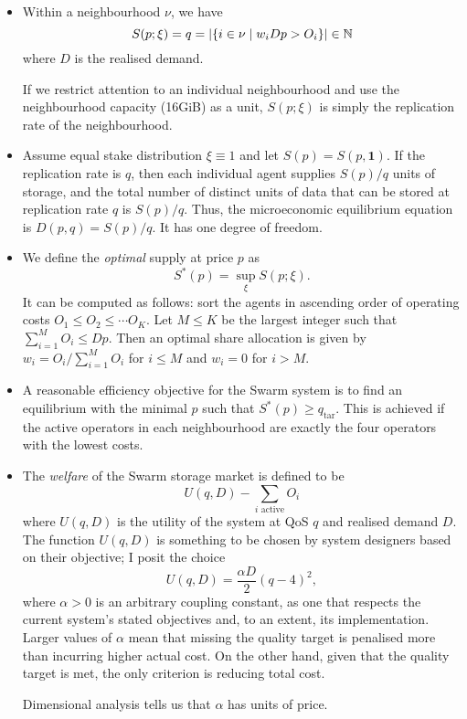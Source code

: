 \begin{itemize}

  \item
    Within a neighbourhood $\nu$, we have 
    \[
      S(p;\xi) = q = |\{i\in\nu \mid w_iDp > O_i  \}| \in \mathbb{N}
    \]
    where $D$ is the realised demand.

    If we restrict attention to an individual neighbourhood and use the neighbourhood capacity (16GiB) as a unit, $S(p;\xi)$ is simply the replication rate of the neighbourhood.

  \item
    Assume equal stake distribution $\xi \equiv 1$ and let $S(p)=S(p,\mathbf{1})$.
    If the replication rate is $q$, then each individual agent supplies $S(p)/q$ units of storage, and the total number of distinct units of data that can be stored at replication rate $q$ is $S(p)/q$.
    Thus, the microeconomic equilibrium equation is $D(p,q)=S(p)/q$.
    It has one degree of freedom.

  \item
    We define the \emph{optimal} supply at price $p$ as
    \[
      S^*(p) = \sup_\xi S(p;\xi).
    \]
    It can be computed as follows: sort the agents in ascending order of operating costs $O_1\leq O_2 \leq \cdots O_K$.
    Let $M\leq K$ be the largest integer such that $\sum_{i=1}^MO_i \leq Dp$.
    Then an optimal share allocation is given by $w_i = O_i / \sum_{i=1}^MO_i$ for $i\leq M$ and $w_i=0$ for $i>M$.

  \item
    A reasonable efficiency objective for the Swarm system is to find an equilibrium with the minimal $p$ such that $S^*(p)\geq q_\mathrm{tar}$.
    This is achieved if the active operators in each neighbourhood are exactly the four operators with the lowest costs.

  \item
    The \emph{welfare} of the Swarm storage market is defined to be
    \[
      U(q,D) - \sum_{i\text{ active}}O_i
    \]
    where $U(q,D)$ is the utility of the system at QoS $q$ and realised demand $D$.
    The function $U(q,D)$ is something to be chosen by system designers based on their objective; I posit the choice
    \[
      U(q,D) = \frac{\alpha D}{2}(q-4)^2,
    \]
    where $\alpha>0$ is an arbitrary coupling constant, as one that respects the current system's stated objectives and, to an extent, its implementation.
    Larger values of $\alpha$ mean that missing the quality target is penalised more than incurring higher actual cost.
    On the other hand, given that the quality target is met, the only criterion is reducing total cost.
    
    Dimensional analysis tells us that $\alpha$ has units of price.

\end{itemize}




